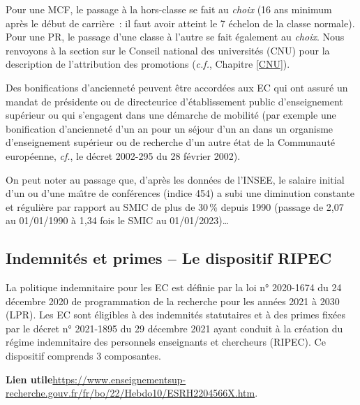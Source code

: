 Pour un\mp e MCF, le passage \`a la hors-classe se fait au {\em choix} (16 ans minimum
apr\`es le d\'ebut de carri\`ere~: il faut avoir atteint le
7\ieme{} \'echelon de la classe normale).
Pour un\mp e PR, le passage d'une classe \`a l'autre se fait \'egalement au {\em choix}.
Nous renvoyons \`a la section sur le Conseil national des universit\'es (CNU) pour la
description de l'attribution des promotions (\textit{c.f.}, Chapitre \ref{CNU}).

Des bonifications d'anciennet\'e peuvent \^etre accord\'ees aux EC
qui ont assur\'e un mandat de pr\'esident\mp e
ou de directeur\mp ice d'\'etablissement public d'enseignement sup\'erieur
ou qui s'engagent dans une d\'emarche de
mobilit\'e (par exemple une bonification d'anciennet\'e d'un an
pour un s\'ejour d'un an dans un organisme d'enseignement sup\'erieur
ou de recherche d'un autre \'etat de la Communaut\'e europ\'eenne,
{\em cf.}, le d\'ecret 2002-295 du 28 f\'evrier 2002).


On peut noter au passage que, d'apr\`es les donn\'ees de l'INSEE, le salaire initial d'un ou d'une ma\^\i tre de
conf\'erences (indice 454) a subi une diminution constante et r\'eguli\`ere
par rapport au SMIC de plus de 30\,\% depuis 1990 (passage de 2,07 au 01/01/1990 \`a 1,34 fois le SMIC au 01/01/2023)\ldots


\subsection{Indemnit\'es et primes -- Le dispositif RIPEC}

La politique indemnitaire pour les EC est d\'efinie par la loi n° 2020-1674 du 24 d\'ecembre 2020 de programmation de la recherche pour les ann\'ees 2021 \`a 2030 (LPR). Les EC sont \'eligibles \`a des indemnit\'es statutaires et \`a des primes fix\'ees par le d\'ecret n° 2021-1895 du 29 d\'ecembre 2021 ayant conduit \`a la cr\'eation du r\'egime indemnitaire des personnels enseignants et chercheurs (RIPEC). Ce dispositif comprends 3 composantes. 

\textbf{Lien utile\hspace{.5em}}\url{https://www.enseignementsup-recherche.gouv.fr/fr/bo/22/Hebdo10/ESRH2204566X.htm}.

